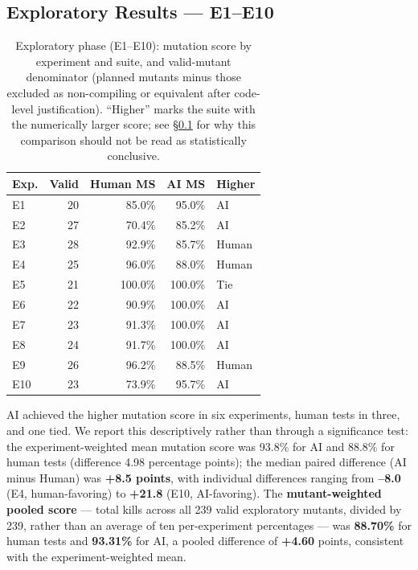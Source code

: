 \documentclass[10pt,conference]{IEEEtran}
\begin{document}
\subsection{Exploratory Results --- E1--E10}
\label{sec:exploratoryresults}

\begin{table}[ht]
\centering
\caption{Exploratory phase (E1--E10): mutation score by experiment and suite, and valid-mutant denominator (planned mutants minus those excluded as non-compiling or equivalent after code-level justification). ``Higher'' marks the suite with the numerically larger score; see \S\ref{sec:exploratoryresults} for why this comparison should not be read as statistically conclusive.}
\label{tab:results}
\begin{tabular}{lrrrl}
\toprule
Exp. & Valid & Human MS & AI MS & Higher \\
\midrule
E1 & 20 & 85.0\% & 95.0\% & AI \\
E2 & 27 & 70.4\% & 85.2\% & AI \\
E3 & 28 & 92.9\% & 85.7\% & Human \\
E4 & 25 & 96.0\% & 88.0\% & Human \\
E5 & 21 & 100.0\% & 100.0\% & Tie \\
E6 & 22 & 90.9\% & 100.0\% & AI \\
E7 & 23 & 91.3\% & 100.0\% & AI \\
E8 & 24 & 91.7\% & 100.0\% & AI \\
E9 & 26 & 96.2\% & 88.5\% & Human \\
E10 & 23 & 73.9\% & 95.7\% & AI \\
\bottomrule
\end{tabular}
\end{table}

AI achieved the higher mutation score in six experiments, human tests in three, and one tied. We report this descriptively rather than through a significance test: the experiment-weighted mean mutation score was 93.8\% for AI and 88.8\% for human tests (difference 4.98 percentage points); the median paired difference (AI minus Human) was \textbf{+8.5 points}, with individual differences ranging from \textbf{--8.0} (E4, human-favoring) to \textbf{+21.8} (E10, AI-favoring). The \textbf{mutant-weighted pooled score} — total kills across all 239 valid exploratory mutants, divided by 239, rather than an average of ten per-experiment percentages — was \textbf{88.70\%} for human tests and \textbf{93.31\%} for AI, a pooled difference of \textbf{+4.60} points, consistent with the experiment-weighted mean.
\end{document}
